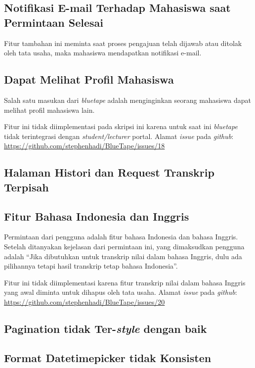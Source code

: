 \subsection{Notifikasi E-mail Terhadap Mahasiswa saat Permintaan Selesai}
\label{issue:17}
Fitur tambahan ini meminta saat proses pengajuan telah dijawab atau ditolak oleh tata usaha, maka mahasiswa mendapatkan notifikasi e-mail.
 

\subsection{Dapat Melihat Profil Mahasiswa}

\label{issue:18}
Salah satu masukan dari \textit{bluetape} adalah menginginkan seorang mahasiswa dapat melihat profil mahasiswa lain.

Fitur ini tidak diimplementasi pada skripsi ini karena untuk saat ini \textit{bluetape} tidak terintegrasi dengan \textit{student/lecturer} portal. Alamat \textit{issue} pada \textit{github}: \url{https://github.com/stephenhadi/BlueTape/issues/18} 

\subsection{Halaman Histori dan Request Transkrip Terpisah}
\label{issue:19}
\subsection{Fitur Bahasa Indonesia dan Inggris}
\label{issue:20}
Permintaan dari pengguna adalah fitur bahasa Indonesia dan bahasa Inggris. Setelah ditanyakan kejelasan dari permintaan ini, yang dimaksudkan pengguna adalah ``Jika dibutuhkan untuk transkrip nilai dalam bahasa Inggris, dulu ada pilihannya tetapi hasil transkrip tetap bahasa Indonesia''.

Fitur ini tidak diimplementasi karena fitur transkrip nilai dalam bahasa Inggris yang awal diminta untuk dihapus oleh tata usaha. Alamat \textit{issue} pada \textit{github}: \url{https://github.com/stephenhadi/BlueTape/issues/20} 
\subsection{Pagination tidak Ter-\textit{style} dengan baik}
\label{issue:22}
\subsection{Format Datetimepicker tidak Konsisten}
\label{issue:23}

